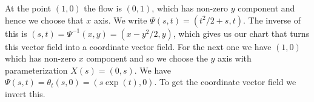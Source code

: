     \begin{solution}
        At the point $(1,0)$ the flow is $(0,1)$, which has non-zero $y$
        component and hence we choose that $x$ axis. We write
        $\Psi(s,t)=(t^{2}/2+s,t)$. The inverse of this is
        $(s,t)=\Psi^{\minus{1}}(x,y)=(x-y^{2}/2,y)$, which gives us our
        chart that turns this vector field into a coordinate vector field.
        For the next one we have $(1,0)$ which has non-zero $x$ component
        and so we choose the $y$ axis with parameterization $X(s)=(0,s)$.
        We have $\Psi(s,t)=\theta_{t}(s,0)=(s\exp(t),0)$. To get the
        coordinate vector field we invert this.
    \end{solution}